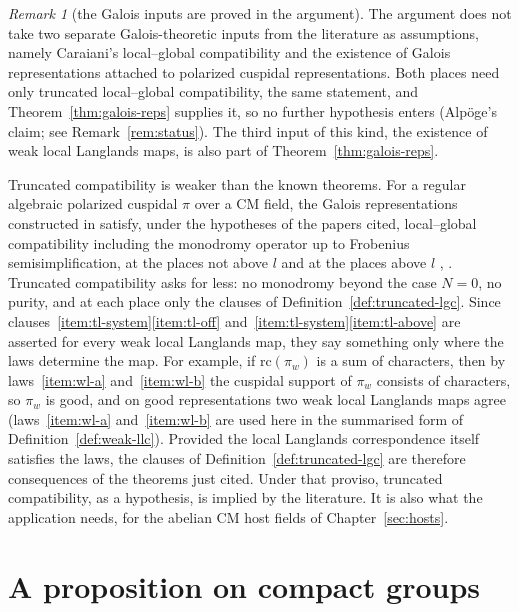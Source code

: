 \documentclass[11pt]{amsbook}
\theoremstyle{plain}
\theoremstyle{definition}
\theoremstyle{remark}
\newtheorem{remark}[theorem]{Remark}
\numberwithin{equation}{section}
\numberwithin{figure}{chapter}
\numberwithin{table}{chapter}
\begin{document}
\begin{remark}[the Galois inputs are proved in the argument]
\label{rem:galois-inputs}
The argument does not take two separate Galois-theoretic inputs from
the literature as assumptions, namely Caraiani's local--global
compatibility and the existence of Galois representations attached to
polarized cuspidal representations. Both places need only truncated
local--global compatibility, the same statement, and
Theorem~\ref{thm:galois-reps} supplies it,
so no further hypothesis enters (Alp\"oge's claim; see
Remark~\ref{rem:status}). The third input of this kind, the existence of
weak local Langlands maps, is also part of
Theorem~\ref{thm:galois-reps}.

Truncated compatibility is weaker than the known theorems. For a
regular algebraic polarized cuspidal $\pi$ over a CM field, the Galois
representations constructed in
\cite{HarrisTaylor2001,Shin2011,ChenevierHarris2013} satisfy, under
the hypotheses of the papers cited, local--global compatibility
including the monodromy operator up to Frobenius semisimplification,
at the places not above $l$ \cite{TaylorYoshida2007,Caraiani2012} and
at the places above $l$
\cite{Caraiani2014}, \cite[Thm.~2.1.1]{BarnetLambGeeGeraghtyTaylor2014}.
Truncated
compatibility asks for less: no monodromy beyond the case $N=0$, no
purity, and at each place only the clauses of
Definition~\ref{def:truncated-lgc}. Since
clauses~\ref{item:tl-system}\ref{item:tl-off}
and~\ref{item:tl-system}\ref{item:tl-above}
are asserted for every weak local Langlands map, they say something
only where the laws determine the map. For example, if
$\mathrm{rc}(\pi_w)$ is a sum of characters, then by laws~\ref{item:wl-a}
and~\ref{item:wl-b}
the cuspidal support of $\pi_w$ consists of characters, so $\pi_w$ is
good, and on good representations two weak local Langlands maps agree
(laws~\ref{item:wl-a} and~\ref{item:wl-b} are used here in the summarised form
of
Definition~\ref{def:weak-llc}).
Provided the local Langlands correspondence itself satisfies the laws,
the clauses of Definition~\ref{def:truncated-lgc} are therefore
consequences of the theorems just cited. Under that proviso,
truncated compatibility, as a hypothesis, is implied by the
literature. It is also
what the application needs, for the abelian CM host fields of
Chapter~\ref{sec:hosts}.
\end{remark}

\section{A proposition on compact groups}
\end{document}
